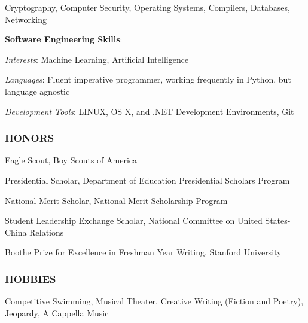 \documentclass[11pt,letterpaper]{article}%
\begin{document}
\hspace{2.4em}
Cryptography, 
Computer Security,
Operating Systems,
Compilers,
Databases,
Networking


\hspace{.6em}
{\bf Software Engineering Skills}:

\hspace{2.4em}
\textit{Interests}:
Machine Learning, Artificial Intelligence

\hspace{2.4em} 
\textit{Languages}: 
Fluent imperative programmer, working frequently in Python, but language agnostic 


\hspace{2.4em} 
\textit{Development Tools}: 
LINUX, OS X, and .NET Development Environments, Git

\vspace{.4em}
\subsubsection*{HONORS}
\vspace{-2ex}
\hrulefill
\vspace{-1.5ex}

\begin{itemize*}
\item Eagle Scout, Boy Scouts of America
\item Presidential Scholar, Department of Education Presidential Scholars Program
\item National Merit Scholar, National Merit Scholarship Program
\item Student Leadership Exchange Scholar, National Committee on United States-China Relations
\item Boothe Prize for Excellence in Freshman Year Writing, Stanford University
\end{itemize*}

\vspace{-.4em}
\subsubsection*{HOBBIES}
\vspace{-2ex}
\hrulefill

\hspace{.6em}
Competitive Swimming, Musical Theater, Creative Writing (Fiction and Poetry), Jeopardy, A Cappella Music

\vspace{-.6em}
\end{document}
